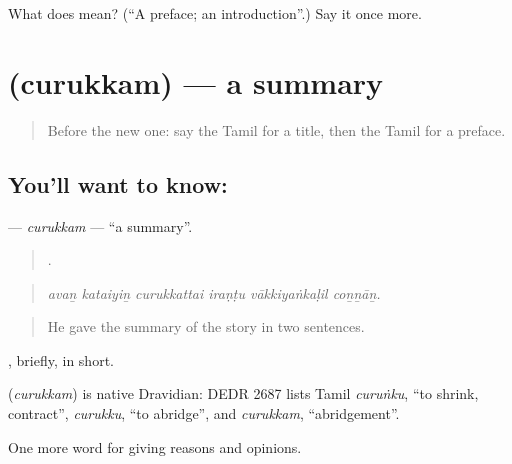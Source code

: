 \begin{tcolorbox}[breakable,colback=teal!4,colframe=teal!35!black,title={Before you move on}]
What does  mean? (\textquotedblleft{}A preface; an introduction\textquotedblright{}.) Say it once more.
\end{tcolorbox}
\section[\texorpdfstring{\ta{சுருக்கம்} (curukkam)}{சுருக்கம் (curukkam)}]{ (curukkam) — a summary}

\label{lesson:TA-C365-curukkam}



\begin{quote}
Before the new one: say the Tamil for a title, then the Tamil for a preface.
\end{quote}

\subsection*{You'll want to know: }
\textbf{} — \emph{curukkam} — \textquotedblleft{}a summary\textquotedblright{}.

\begin{quote}
     .
\end{quote}

\begin{quote}
\emph{avaṉ kataiyiṉ curukkattai iraṇṭu vākkiyaṅkaḷil coṉṉāṉ.}
\end{quote}

\begin{quote}
He gave the summary of the story in two sentences.
\end{quote}

, briefly, in short.

\begin{cousinweb}
\textbf{} (\emph{curukkam}) is native Dravidian: DEDR 2687 lists Tamil \emph{curuṅku}, \textquotedblleft{}to shrink, contract\textquotedblright{}, \emph{curukku}, \textquotedblleft{}to abridge\textquotedblright{}, and \emph{curukkam}, \textquotedblleft{}abridgement\textquotedblright{}.
\end{cousinweb}

\begin{grammarlens}[title={What you've built}]
One more word for giving reasons and opinions.
\end{grammarlens}

